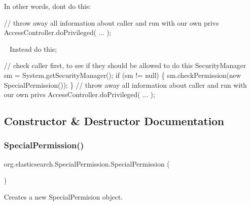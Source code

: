 In other words, don\textquotesingle{}t do this\+: ~\newline
 
\begin{DoxyPre}{\ttfamily 
  // throw away all information about caller and run with our own privs
  AccessController.doPrivileged(
   ...
  );
}\end{DoxyPre}
 ~\newline
 Instead do this; ~\newline
 
\begin{DoxyPre}{\ttfamily 
  // check caller first, to see if they should be allowed to do this
  SecurityManager sm = System.getSecurityManager();
  if (sm != null) \{
    sm.checkPermission(new SpecialPermission());
  \}
  // throw away all information about caller and run with our own privs
  AccessController.doPrivileged(
   ...
  );
}\end{DoxyPre}
 

\subsection{Constructor \& Destructor Documentation}
\hypertarget{classorg_1_1elasticsearch_1_1_special_permission_ad7d44e1b12cf47115d5f4f0438238c82}{}\label{classorg_1_1elasticsearch_1_1_special_permission_ad7d44e1b12cf47115d5f4f0438238c82} 
\subsubsection{\texorpdfstring{Special\+Permission()}{SpecialPermission()}\hspace{0.1cm}{\footnotesize\ttfamily [1/2]}}
{\footnotesize\ttfamily org.\+elasticsearch.\+Special\+Permission.\+Special\+Permission (\begin{DoxyParamCaption}{ }\end{DoxyParamCaption})}

Creates a new Special\+Permision object. \hypertarget{classorg_1_1elasticsearch_1_1_special_permission_abe8ca62b43aea4849338562577fc037b}{}\label{classorg_1_1elasticsearch_1_1_special_permission_abe8ca62b43aea4849338562577fc037b} 
